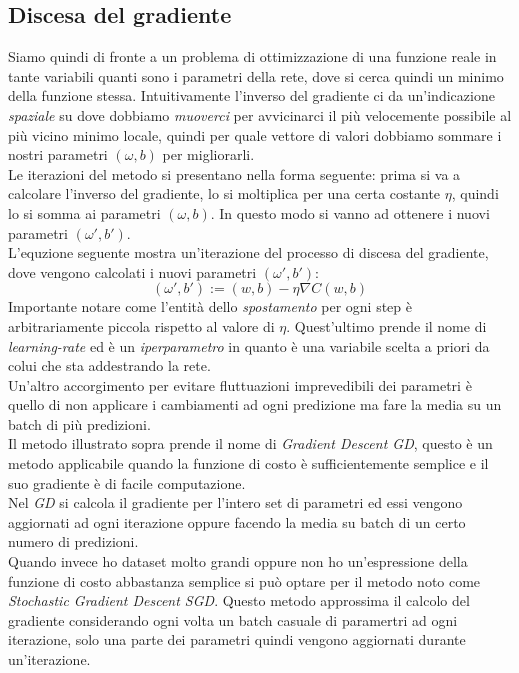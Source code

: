 \documentclass[12pt,a4paper,openright,twoside]{report}
\begin{document}
\subsection{Discesa del gradiente}
Siamo quindi di fronte a un problema di ottimizzazione di una funzione reale in tante variabili quanti sono i parametri della rete, dove si cerca quindi un minimo della funzione stessa.
Intuitivamente l'inverso del gradiente ci da un'indicazione \emph{spaziale} su dove dobbiamo \emph{muoverci} per avvicinarci il più velocemente possibile al più vicino minimo locale, quindi per quale vettore di valori dobbiamo sommare i nostri parametri $(\omega,b)$ per migliorarli. \\
\newpage
Le iterazioni del metodo si presentano nella forma seguente: prima si va a calcolare l'inverso del gradiente, lo si moltiplica per una certa costante $\eta$, quindi lo si somma ai parametri $(\omega,b)$. In questo modo si vanno ad ottenere i nuovi parametri $(\omega', b')$. \\
L'equzione seguente mostra un'iterazione del processo di discesa del gradiente, dove vengono calcolati i nuovi parametri $(\omega', b')$:
\begin{equation}
    (\omega', b') := (w,b)-\eta \nabla C(w,b)
\end{equation}
Importante notare come l'entità dello \emph{spostamento} per ogni step è arbitrariamente piccola rispetto al valore di $\eta$. Quest'ultimo prende il nome di \emph{learning-rate} ed è un \emph{iperparametro} in quanto è una variabile scelta a priori da colui che sta addestrando la rete. \\
Un'altro accorgimento per evitare fluttuazioni imprevedibili dei parametri è quello di non applicare i cambiamenti ad ogni predizione ma fare la media su un batch di più predizioni. \\
Il metodo illustrato sopra prende il nome di \emph{Gradient Descent GD}\cite{K1}, questo è un metodo applicabile quando la funzione di costo è sufficientemente semplice e il suo gradiente è di facile computazione.\\
Nel \emph{GD} si calcola il gradiente per l'intero set di parametri ed essi vengono aggiornati ad ogni iterazione oppure facendo la media su batch di un certo numero di predizioni. \\
Quando invece ho dataset molto grandi oppure non ho un'espressione della funzione di costo abbastanza semplice si può optare per il metodo noto come \emph{Stochastic Gradient Descent SGD}.
Questo metodo approssima il calcolo del gradiente considerando ogni volta un batch casuale di paramertri ad ogni iterazione, solo una parte dei parametri quindi vengono aggiornati durante un'iterazione.
\end{document}
